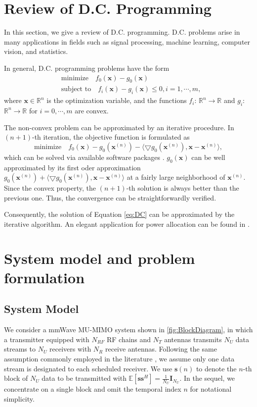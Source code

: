 \documentclass[10pt,journal,twocolumn,twoside]{IEEEtran}
\begin{document}
\section{Review of D.C. Programming}
In this section, we give a review of D.C. programming. D.C. problems arise in many applications in fields such as signal processing, machine learning, computer vision, and statistics. 

In general, D.C. programming problems have the form
\begin{align}\label{eq:DC}
&{\text{minimize}}\quad f_0(\bm{x}) - g_0(\bm{x})\\
&\text{subject to} \quad  f_i(\bm{x}) - g_i(\bm{x})\leq 0, i= 1,\cdots, m, \nonumber
\end{align}
where $\bm{x}\in \mathbb{R}^n$ is the optimization variable, and the functions $f_i$: $\mathbb{R}^n \rightarrow \mathbb{R}$ and $g_i$: $\mathbb{R}^n\rightarrow \mathbb{R}$ for $i = 0, \cdots, m$ are convex.

The non-convex problem can be approximated by an iterative procedure. In $(n+1)$-th iteration, the objective function is formulated as 
\begin{equation}\label{convex}
\text{minimize} \quad f_0(\bm{x}) - g_0(\bm{x}^{(n)}) - \langle \bigtriangledown g_0(\bm{x}^{(n)}), \bm{x} - \bm{x}^{(n)} \rangle,
\end{equation}
which can be solved via available software packages \cite{cvx}. $g_0(\bm{x})$ can be well approximated by its first oder approximation $g_0(\bm{x}^{(n)}) + \langle \bigtriangledown g_0(\bm{x}^{(n)}), \bm{x} - \bm{x}^{(n)} \rangle$ at a fairly large neighborhood of $\bm{x}^{(n)}$. Since the convex property, the $(n+1)$-th solution is always better than the previous one. Thus, the convergence can be straightforwardly verified.

Consequently, the solution of Equation \eqref{eq:DC} can be approximated by the iterative algorithm.  An elegant application for power allocation can be found in \cite{kha2012fast}.

\section{System model and problem formulation}\label{system}
\subsection{System Model}
We consider a mmWave MU-MIMO system shown in \figurename{ \ref{fig:BlockDiagram}}, in which a transmitter equipped with $N_{RF}$ RF chains and $N_T$ antennas transmits $N_U$ data streams to $N_U$ receivers with $N_R$ receive antennas. Following the same assumption commonly employed in the literature \cite{alkhateeb2015limited}, we assume only one data stream is designated to each scheduled receiver. We use ${\bm s}(n)$ to denote the $n$-th block of $N_U$ data to be transmitted with $\mathbb{E}\left[\bm{ss}^H\right]=\frac{1}{N_U}\bm{I}_{N_U}$. In the sequel, we concentrate on a single block and omit the temporal index $n$ for notational simplicity.
\end{document}
